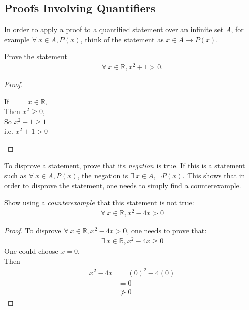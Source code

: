\documentclass[../notes.tex]{subfiles}
\begin{document}
			\subsection{Proofs Involving Quantifiers}
				In order to apply a proof to a quantified statement over an infinite set $A$, for example $\forall \: x \in A, P(x)$, think of the statement as $x \in A \rightarrow P(x)$.
				\begin{example}[width=0.38\textwidth]
					Prove the statement
					\begin{align*}
						\forall \: x \in \mathbb{R}, x^{2} + 1 > 0.
					\end{align*}
					\begin{proof}
						$ $
						\begin{tabbing}
							If $\qquad$ \=$x \in \mathbb{R}$,\\
							Then \>$x^{2} \geq 0$,\\
							So \> $x^{2} + 1 \geq 1$\\
							i.e. \> $x^{2} + 1 > 0$
						\end{tabbing}
					\end{proof}
				\end{example}
				To disprove a statement, prove that its \emph{negation} is true. If this is a statement such as $\forall \: x \in A, P(x)$, the negation is $\exists \: x \in A, \lnot P(x)$. This shows that in order to disprove the statement, one needs to simply find a counterexample.
				\begin{example}[width=0.8\textwidth]
					Show using a \emph{counterexample} that this statement is not true:
					\begin{align*}
						\forall \: x \in \mathbb{R}, x^{2} - 4x > 0
					\end{align*}
					\begin{proof}
						To disprove $\forall \: x \in \mathbb{R}, x^{2} - 4x > 0$, one needs to prove that:
						\begin{align*}
							\exists \: x \in \mathbb{R}, x^{2} - 4x \geq 0
						\end{align*}
						One could choose $x = 0$.\\
						Then \begin{align*}
							x^{2} - 4x &= (0)^{2} - 4(0)\\
							&= 0\\
							& \not > 0
						\end{align*}
					\end{proof}
				\end{example}
			\pagebreak
\end{document}
